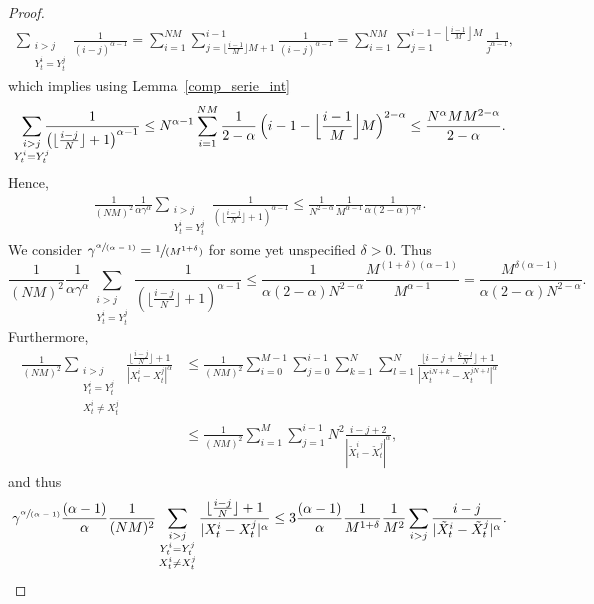 \documentclass[JEP,XML,SOM,Unicode,published]{cedram}
\newcommand{\spfrac}[2]{\sfrac{#1}{(#2)}}
\theoremstyle{plain}
\theoremstyle{definition}
\begin{document}
\begin{proof}
\begin{gather*}
\tag*{and}
\sum_{\substack{i>j\\Y^i_t= Y^j_t}}\frac{1}{(i-j)^{\alpha-1}}=\sum_{i=1}^{NM}\sum_{j=\lfloor\frac{i-1}{M}\rfloor M+1}^{i-1}\frac{1}{(i-j)^{\alpha-1}}=\sum_{i=1}^{NM}\sum_{j=1}^{i-1-\left\lfloor\frac{i-1}{M}\right\rfloor M}\frac{1}{j^{\alpha-1}},
\end{gather*}
which implies using Lemma~\ref{comp_serie_int}\vspace*{-3pt}
\[
\sum_{\substack{i>j\\Y^i_t= Y^j_t}}\hspace*{-2mm}\frac{1}{\left(\lfloor\frac{i-j}{N}\rfloor+1\right)^{\alpha-1}}\leq N^{\alpha-1}\sum_{i=1}^{NM}\frac{1}{2-\alpha}\,\Bigl(i-1-\Bigl\lfloor\frac{i-1}{M}\Bigr\rfloor M\Bigr)^{2-\alpha}\leq \frac{N^\alpha MM^{2-\alpha}}{2-\alpha}.
\]
Hence,\vspace*{-5pt}
\begin{align*}
\frac{1}{(NM)^2}\frac{1}{\alpha\gamma^\alpha}\sum_{\substack{i>j\\Y^i_t= Y^j_t}}\frac{1}{\left(\lfloor\frac{i-j}{N}\rfloor+1\right)^{\alpha-1}}\leq\frac{1}{N^{2-\alpha}}\frac{1}{M^{\alpha-1}}\frac{1}{\alpha(2-\alpha)\gamma^\alpha}.
\end{align*}
We consider $\gamma^{\spfrac{\alpha}{\alpha-1}}=\spfrac{1}{M^{1+\delta}}$ for some yet unspecified $\delta>0$. Thus\vspace*{-3pt}
\[
\frac{1}{(NM)^2}\frac{1}{\alpha\gamma^\alpha}\sum_{\substack{i>j\\Y^i_t= Y^j_t}}\frac{1}{\left(\lfloor\frac{i-j}{N}\rfloor+1\right)^{\alpha-1}}\leq\frac{1}{\alpha(2-\alpha) N^{2-\alpha}}\frac{M^{(1+\delta)(\alpha-1)}}{M^{\alpha-1}}=\frac{M^{\delta(\alpha-1)}}{\alpha(2-\alpha) N^{2-\alpha}}.
\]
Furthermore,
\begin{align*}
\frac{1}{(NM)^2}\sum_{\substack{i>j\\Y^i_t= Y^j_t\\X^i_t\neq X^j_t}}\frac{\lfloor\frac{i-j}{N}\rfloor+1}{|X^i_t-X^j_t|^{\alpha}}
&\leq \frac{1}{(NM)^2}\sum_{i=0}^{M-1}\sum_{j=0}^{i-1}\sum_{k=1}^N\sum_{l=1}^N\frac{\lfloor i-j+\frac{k-l}{N}\rfloor+1}{|X^{iN+k}_t-X^{jN+l}_t|^{\alpha}}\\[-15pt]
&\leq \frac{1}{(NM)^2}\sum_{i=1}^{M}\sum_{j=1}^{i-1}N^2\frac{i-j+2}{|\tilde{X}^{i}_t-\tilde{X}^{j}_t|^{\alpha}},
\end{align*}
and thus
\[
\gamma^{\spfrac{\alpha}{\alpha-1}}\frac{(\alpha-1)}{\alpha}\frac{1}{(NM)^2}\sum_{\substack{i>j\\Y^i_t= Y^j_t\\X^i_t\neq X^j_t}}\frac{\lfloor\frac{i-j}{N}\rfloor+1}{|X^i_t-X^j_t|^{\alpha}}\leq 3\frac{(\alpha-1)}{\alpha}\frac{1}{M^{1+\delta}}\frac{1}{M^2}\sum_{i>j}\frac{i-j}{|\tilde{X}^{i}_t-\tilde{X}^{j}_t|^{\alpha}}.
\]
\end{proof}
\end{document}
